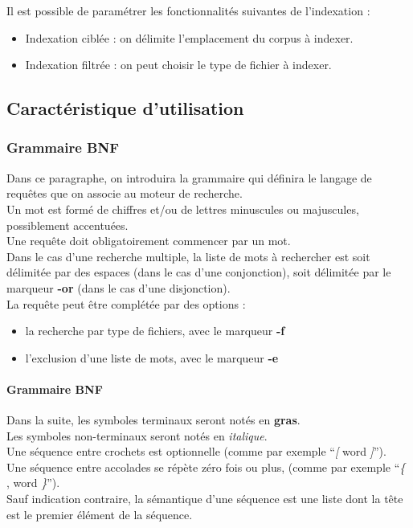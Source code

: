\documentclass[a4paper,10pt]{article}
\begin{document}
Il est possible de paramétrer les fonctionnalités suivantes de l'indexation :
\begin{itemize}
 \item Indexation ciblée : on délimite l'emplacement du corpus à indexer.
 \item Indexation filtrée : on peut choisir le type de fichier à indexer.
\end{itemize}


\subsection{Caractéristique d'utilisation}

\subsubsection{Grammaire BNF}
Dans ce paragraphe, on introduira la grammaire qui définira le langage de requêtes que on associe au moteur de recherche.\\

Un mot est formé de chiffres et/ou de lettres minuscules ou majuscules, possiblement accentuées.\\

Une requête doit obligatoirement commencer par un mot.\\

Dans le cas d'une recherche multiple, la liste de mots à rechercher est soit délimitée par 
des espaces (dans le cas d'une conjonction), soit délimitée par le marqueur \textbf{-or} (dans le
cas d'une disjonction).\\

La requête peut être complétée par des options :
\begin{itemize}
 \item la recherche par type de fichiers, avec le marqueur \textbf{-f}
 \item l'exclusion d'une liste de mots, avec le marqueur \textbf{-e}
 \end{itemize}

\paragraph{Grammaire BNF\\}
Dans la suite, les symboles terminaux seront notés en \textbf{gras}.\\
Les symboles non-terminaux seront notés en \textit{italique}.\\
Une séquence entre crochets est optionnelle (comme par exemple ``\textit{[} word \textit{]}'').\\
Une séquence entre accolades se répète zéro fois ou plus, (comme par exemple ``\textit{\{} , word \textit{\}}'').\\
Sauf indication contraire, la sémantique d’une séquence est une liste dont la tête est le premier élément de la séquence.\\
\end{document}
